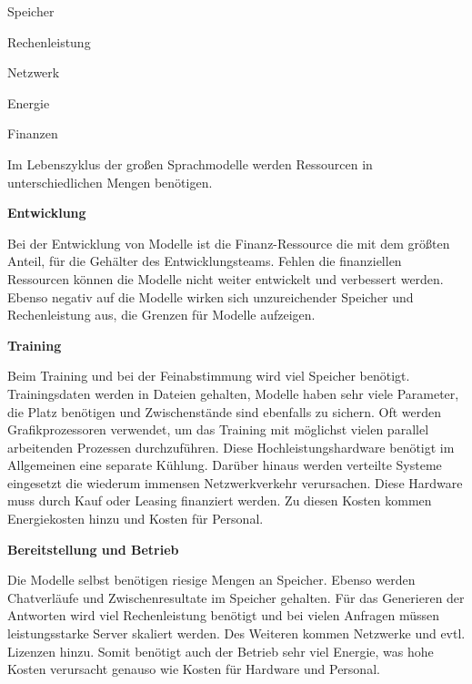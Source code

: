 \begin{myitemize}
	\item Speicher
	\item Rechenleistung
	\item Netzwerk
	\item Energie
	\item Finanzen
\end{myitemize}

Im Lebenszyklus der großen Sprachmodelle werden Ressourcen in unterschiedlichen Mengen benötigen.\vspace{0.2cm}

\textbf{Entwicklung}\vspace{0.2cm}

Bei der Entwicklung von Modelle ist die Finanz-Ressource die mit dem größten Anteil, für die Gehälter des Entwicklungsteams. Fehlen die finanziellen Ressourcen können die Modelle nicht weiter entwickelt und verbessert werden. Ebenso negativ auf die Modelle wirken sich unzureichender Speicher und Rechenleistung aus, die Grenzen für Modelle aufzeigen.\vspace{0.2cm}

\textbf{Training}\vspace{0.2cm}

Beim Training und bei der Feinabstimmung wird viel Speicher benötigt. Trainingsdaten werden in Dateien gehalten, Modelle haben sehr viele Parameter, die Platz benötigen und Zwischenstände sind ebenfalls zu sichern. Oft werden Grafikprozessoren verwendet, um das Training mit möglichst vielen parallel arbeitenden Prozessen durchzuführen. Diese Hochleistungshardware benötigt im Allgemeinen eine separate Kühlung. Darüber hinaus werden verteilte Systeme eingesetzt die wiederum immensen Netzwerkverkehr verursachen. Diese Hardware muss durch Kauf oder Leasing finanziert werden. Zu diesen Kosten kommen Energiekosten hinzu und Kosten für Personal.\vspace{0.2cm}

\textbf{Bereitstellung und Betrieb}\vspace{0.2cm}

Die Modelle selbst benötigen riesige Mengen an Speicher. Ebenso werden Chatverläufe und Zwischenresultate im Speicher gehalten. Für das Generieren der Antworten wird viel Rechenleistung benötigt und bei vielen Anfragen müssen leistungsstarke Server skaliert werden. Des Weiteren kommen Netzwerke und evtl. Lizenzen hinzu. Somit benötigt auch der Betrieb sehr viel Energie, was hohe Kosten verursacht genauso wie Kosten für Hardware und Personal.


